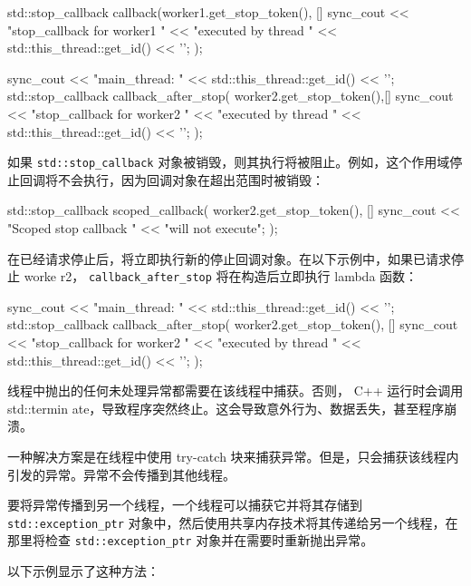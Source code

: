 \begin{cpp}
std::stop_callback callback(worker1.get_stop_token(), []{
    sync_cout << "stop_callback for worker1 "
              << "executed by thread "
              << std::this_thread::get_id() << '\n';
});

sync_cout << "main_thread: "
          << std::this_thread::get_id() << '\n';
std::stop_callback callback_after_stop(
    worker2.get_stop_token(),[] {
        sync_cout << "stop_callback for worker2 "
                  << "executed by thread "
                  << std::this_thread::get_id() << '\n';
});
\end{cpp}

如果 \verb|std::stop_callback| 对象被销毁，则其执行将被阻止。例如，这个作用域停止回调将不会执行，因为回调对象在超出范围时被销毁：

\begin{cpp}
{
    std::stop_callback scoped_callback(
    worker2.get_stop_token(), []{
        sync_cout << "Scoped stop callback "
                  << "will not execute\n";
    }
    );
}
\end{cpp}

在已经请求停止后，将立即执行新的停止回调对象。在以下示例中，如果已请求停止 worke r2， \verb|callback_after_stop| 将在构造后立即执行 lambda 函数：

\begin{cpp}
sync_cout << "main_thread: "
          << std::this_thread::get_id() << '\n';
std::stop_callback callback_after_stop(
    worker2.get_stop_token(), []{
        sync_cout << "stop_callback for worker2 "
                  << "executed by thread "
                  << std::this_thread::get_id() << '\n';
    }
);
\end{cpp}


线程中抛出的任何未处理异常都需要在该线程中捕获。否则， C++ 运行时会调用 std::termin ate，导致程序突然终止。这会导致意外行为、数据丢失，甚至程序崩溃。

一种解决方案是在线程中使用 try-catch 块来捕获异常。但是，只会捕获该线程内引发的异常。异常不会传播到其他线程。

要将异常传播到另一个线程，一个线程可以捕获它并将其存储到 \verb|std::exception_ptr| 对象中，然后使用共享内存技术将其传递给另一个线程，在那里将检查 \verb|std::exception_ptr| 对象并在需要时重新抛出异常。

以下示例显示了这种方法：

